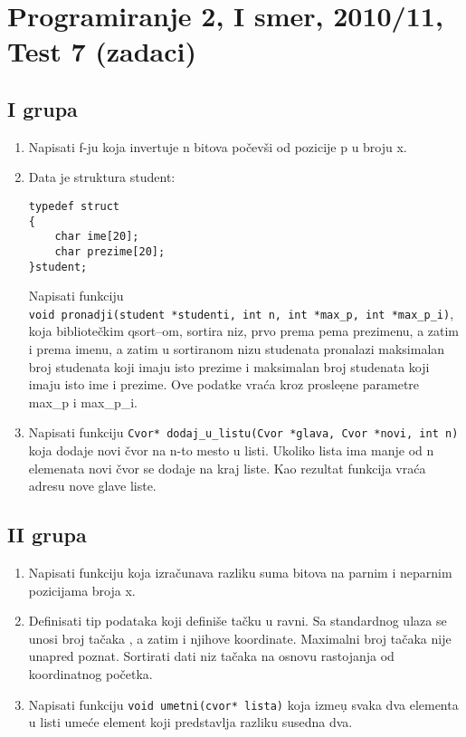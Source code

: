 \section{Programiranje 2, I smer, 2010/11, Test 7 (zadaci)}

\subsection{I grupa}
\begin{enumerate}
 \item Napisati f-ju koja invertuje n bitova po\v cev\v si od pozicije p u broju x.

 \item Data je struktura student:
\begin{verbatim}
typedef struct
{
    char ime[20];
    char prezime[20];
}student;
\end{verbatim}
Napisati funkciju \\ \verb|void pronadji(student *studenti, int n, int *max_p, int *max_p_i)|, koja bibliote\v ckim qsort--om, sortira niz, prvo prema
pema prezimenu, a zatim i prema imenu, a zatim u sortiranom nizu studenata pronalazi maksimalan broj studenata koji imaju isto prezime i
 maksimalan broj studenata koji imaju isto ime i prezime. Ove podatke vra\' ca kroz prosle\d ene parametre max\_p i max\_p\_i.

\item Napisati funkciju \verb|Cvor* dodaj_u_listu(Cvor *glava, Cvor *novi, int n)| koja dodaje novi \v cvor na n-to mesto u listi. Ukoliko lista ima
      manje od n elemenata novi \v cvor se dodaje na kraj liste. Kao rezultat funkcija vra\' ca adresu nove glave liste.

\end{enumerate}

\subsection{II grupa}
\begin{enumerate}
 \item Napisati funkciju koja izra\v cunava razliku suma bitova na parnim i neparnim pozicijama broja x.

 \item Definisati tip podataka koji defini\v se ta\v cku u ravni. Sa standardnog ulaza
se unosi broj ta\v caka , a zatim i njihove koordinate. Maximalni broj ta\v caka
nije unapred poznat.
Sortirati dati niz ta\v caka na osnovu rastojanja od koordinatnog po\v cetka.


\item Napisati funkciju \verb|void umetni(cvor* lista)| koja izme\d u svaka dva elementa u listi ume\' ce element koji predstavlja razliku susedna dva.

\end{enumerate}


